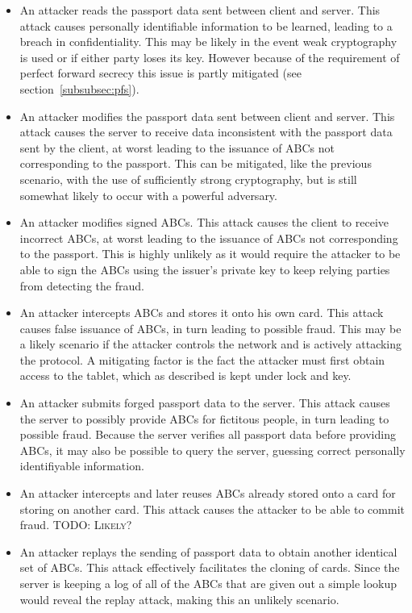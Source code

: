 \begin{itemize}
	\item An attacker reads the passport data sent between client and server. This attack causes personally identifiable information to be learned, leading to a breach in confidentiality. This may be likely in the event weak cryptography is used or if either party loses its key. However because of the requirement of perfect forward secrecy this issue is partly mitigated (see section~\ref{subsubsec:pfs}).
  \item An attacker modifies the passport data sent between client and server. This attack causes the server to receive data inconsistent with the passport data sent by the client, at worst leading to the issuance of ABCs not corresponding to the passport. This can be mitigated, like the previous scenario, with the use of sufficiently strong cryptography, but is still somewhat likely to occur with a powerful adversary.
  \item An attacker modifies signed ABCs. This attack causes the client to receive incorrect ABCs, at worst leading to the issuance of ABCs not corresponding to the passport. This is highly unlikely as it would require the attacker to be able to sign the ABCs using the issuer's private key to keep relying parties from detecting the fraud.
  \item An attacker intercepts ABCs and stores it onto his own card. This attack causes false issuance of ABCs, in turn leading to possible fraud. This may be a likely scenario if the attacker controls the network and is actively attacking the protocol. A mitigating factor is the fact the attacker must first obtain access to the tablet, which as described is kept under lock and key.
  \item An attacker submits forged passport data to the server. This attack causes the server to possibly provide ABCs for fictitous people, in turn leading to possible fraud. Because the server verifies all passport data before providing ABCs, it may also be possible to query the server, guessing correct personally identifiyable information.
  \item An attacker intercepts and later reuses ABCs already stored onto a card for storing on another card. This attack causes the attacker to be able to commit fraud. \textsc{TODO: Likely?}
  \item An attacker replays the sending of passport data to obtain another identical set of ABCs. This attack effectively facilitates the cloning of cards. Since the server is keeping a log of all of the ABCs that are given out a simple lookup would reveal the replay attack, making this an unlikely scenario.

\end{itemize}
